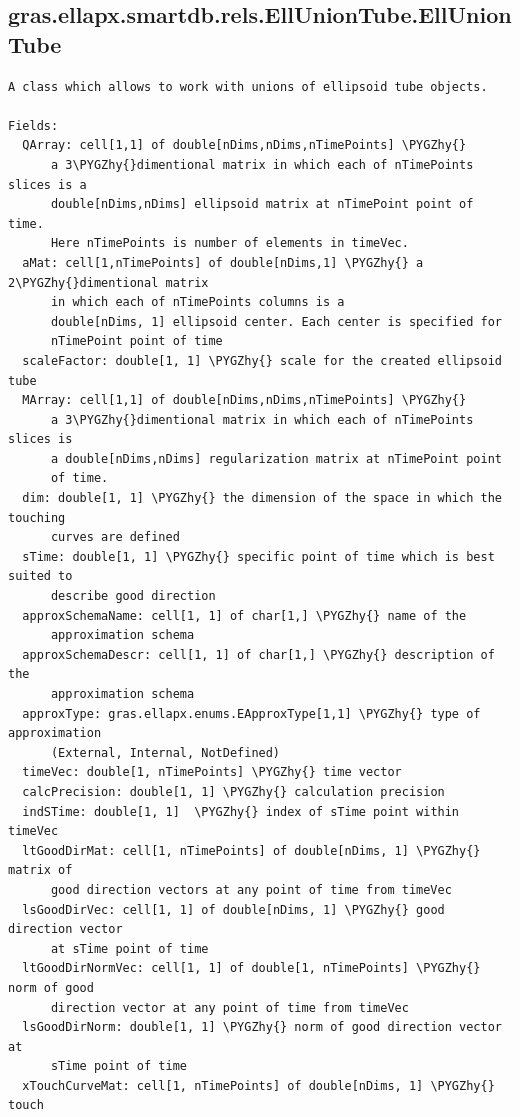 \documentclass[letterpaper,10pt,english]{sphinxmanual}
\def\PYGZhy{\char`\-}
\begin{document}
\subsection{gras.ellapx.smartdb.rels.EllUnionTube.EllUnionTube}
\label{chap_functions:gras-ellapx-smartdb-rels-elluniontube-elluniontube}
\begin{Verbatim}[commandchars=\\\{\}]
A class which allows to work with unions of ellipsoid tube objects.

Fields:
  QArray: cell[1,1] of double[nDims,nDims,nTimePoints] \PYGZhy{}
      a 3\PYGZhy{}dimentional matrix in which each of nTimePoints slices is a
      double[nDims,nDims] ellipsoid matrix at nTimePoint point of time.
      Here nTimePoints is number of elements in timeVec.
  aMat: cell[1,nTimePoints] of double[nDims,1] \PYGZhy{} a 2\PYGZhy{}dimentional matrix
      in which each of nTimePoints columns is a
      double[nDims, 1] ellipsoid center. Each center is specified for
      nTimePoint point of time
  scaleFactor: double[1, 1] \PYGZhy{} scale for the created ellipsoid tube
  MArray: cell[1,1] of double[nDims,nDims,nTimePoints] \PYGZhy{}
      a 3\PYGZhy{}dimentional matrix in which each of nTimePoints slices is
      a double[nDims,nDims] regularization matrix at nTimePoint point
      of time.
  dim: double[1, 1] \PYGZhy{} the dimension of the space in which the touching
      curves are defined
  sTime: double[1, 1] \PYGZhy{} specific point of time which is best suited to
      describe good direction
  approxSchemaName: cell[1, 1] of char[1,] \PYGZhy{} name of the
      approximation schema
  approxSchemaDescr: cell[1, 1] of char[1,] \PYGZhy{} description of the
      approximation schema
  approxType: gras.ellapx.enums.EApproxType[1,1] \PYGZhy{} type of approximation
      (External, Internal, NotDefined)
  timeVec: double[1, nTimePoints] \PYGZhy{} time vector
  calcPrecision: double[1, 1] \PYGZhy{} calculation precision
  indSTime: double[1, 1]  \PYGZhy{} index of sTime point within timeVec
  ltGoodDirMat: cell[1, nTimePoints] of double[nDims, 1] \PYGZhy{} matrix of
      good direction vectors at any point of time from timeVec
  lsGoodDirVec: cell[1, 1] of double[nDims, 1] \PYGZhy{} good direction vector
      at sTime point of time
  ltGoodDirNormVec: cell[1, 1] of double[1, nTimePoints] \PYGZhy{} norm of good
      direction vector at any point of time from timeVec
  lsGoodDirNorm: double[1, 1] \PYGZhy{} norm of good direction vector at
      sTime point of time
  xTouchCurveMat: cell[1, nTimePoints] of double[nDims, 1] \PYGZhy{} touch

\end{Verbatim}
\end{document}
